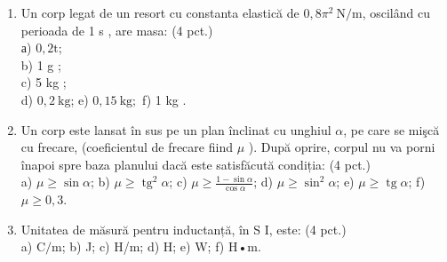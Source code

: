 \begin{enumerate}
  \item Un corp legat de un resort cu constanta elastică de $0,8 \pi^{2} \mathrm{~N} / \mathrm{m}$, oscilând cu perioada de 1 s , are masa: (4 pct.)\\
а) $0,2 \mathrm{t}$;\\
b) 1 g ;\\
c) 5 kg ;\\
d) $0,2 \mathrm{~kg}$; e) $0,15 \mathrm{~kg} ;$ f) 1 kg .
  \item Un corp este lansat în sus pe un plan înclinat cu unghiul $\alpha$, pe care se mişcă cu frecare, (coeficientul de frecare fiind $\mu$ ). După oprire, corpul nu va porni înapoi spre baza planului dacă este satisfăcută condiția: (4 pct.)\\
a) $\mu \geq \sin \alpha$; b) $\mu \geq \operatorname{tg}^{2} \alpha$; c) $\mu \geq \frac{1-\sin \alpha}{\cos \alpha}$; d) $\mu \geq \sin ^{2} \alpha$; e) $\mu \geq \operatorname{tg} \alpha$; f) $\mu \geq 0,3$.
  \item Unitatea de măsură pentru inductanță, în S I, este: (4 pct.)\\
a) $\mathrm{C} / \mathrm{m}$; b) J; c) H/m; d) H; e) W; f) H•m.
\end{enumerate}

